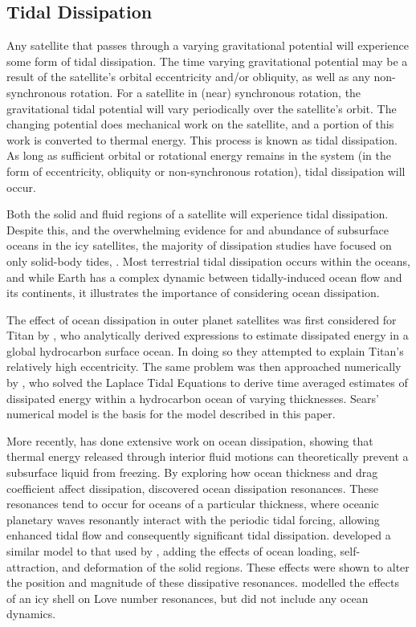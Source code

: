 \subsection{Tidal Dissipation}

Any satellite that passes through a varying gravitational potential will experience some form of tidal dissipation. The time varying gravitational potential may be a result of the satellite's orbital eccentricity and/or obliquity, as well as any non-synchronous rotation. For a satellite in (near) synchronous rotation, the gravitational tidal potential will vary periodically over the satellite's orbit. The changing potential does mechanical work on the satellite, and a portion of this work is converted to thermal energy. This process is known as tidal dissipation. As long as sufficient orbital or rotational energy remains in the system (in the form of eccentricity, obliquity or non-synchronous rotation), tidal dissipation will occur.

Both the solid and fluid regions of a satellite will experience tidal dissipation. Despite this, and the overwhelming evidence for and abundance of subsurface oceans in the icy satellites, the majority of dissipation studies have focused on only solid-body tides, \citep[e.g.,][]{moore2000tidal, tobie2005tidal,roberts2008tidal, beuthe2013spatial}.
Most terrestrial tidal dissipation occurs within the oceans, and while Earth has a complex dynamic between tidally-induced ocean flow and its continents, it illustrates the importance of considering ocean dissipation.

The effect of ocean dissipation in outer planet satellites was first considered for Titan by \citet{sagan1982tide}, who analytically derived expressions to estimate dissipated energy in a global hydrocarbon surface ocean. In doing so they attempted to explain Titan's relatively high eccentricity. The same problem was then approached numerically by \citet{sears1995tidal}, who solved the Laplace Tidal Equations to derive time averaged estimates of dissipated energy within a hydrocarbon ocean of varying thicknesses. Sears' numerical model is the basis for the model described in this paper. 

More recently, \citet{tyler2008strong,tyler2009ocean,tyler2011tidal,tyler2014comparative} has done extensive work on ocean dissipation, showing that thermal energy released through interior fluid motions can theoretically prevent a subsurface liquid from freezing. By exploring how ocean thickness and drag coefficient affect dissipation, \citet{tyler2011tidal} discovered ocean dissipation resonances. These resonances tend to occur for oceans of a particular thickness, where oceanic planetary waves resonantly interact with the periodic tidal forcing, allowing enhanced tidal flow and consequently significant tidal dissipation. \citet{matsuyama2014tidal} developed a similar model to that used by \citet{tyler2011tidal}, adding the effects of ocean loading, self-attraction, and deformation of the solid regions. These effects were shown to alter the position and magnitude of these dissipative resonances. \citet{kamata2015tidal} modelled the effects of an icy shell on Love number resonances, but did not include any ocean dynamics.

